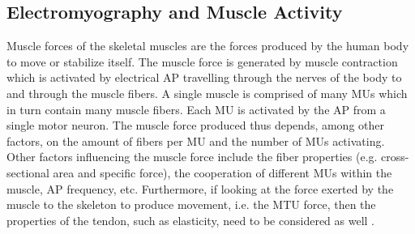 \documentclass[../main.tex]{subfiles}
\begin{document}

\subsection{Electromyography and Muscle Activity}
\label{sec:A-EMG}
Muscle forces of the skeletal muscles are the forces produced by the human body to move or stabilize itself. 
The muscle force is generated by muscle contraction which is activated by electrical \ac{AP} travelling through the nerves of the body to and through the muscle fibers. 
A single muscle is comprised of many \acp{MU} which in turn contain many muscle fibers.
Each \ac{MU} is activated by the \ac{AP} from a single motor neuron.
The muscle force produced thus depends, among other factors, on the amount of fibers per \ac{MU} and the number of \acp{MU} activating.
Other factors influencing the muscle force include the fiber properties (e.g. cross-sectional area and specific force), the cooperation of different \acp{MU} within the muscle, \ac{AP} frequency, etc.
Furthermore, if looking at the force exerted by the muscle to the skeleton to produce movement, i.e. the \ac{MTU} force, then the properties of the tendon, such as elasticity, need to be considered as well \cite{Pizzolato2015, Enoka2016, Farina2016}. 
\end{document}
